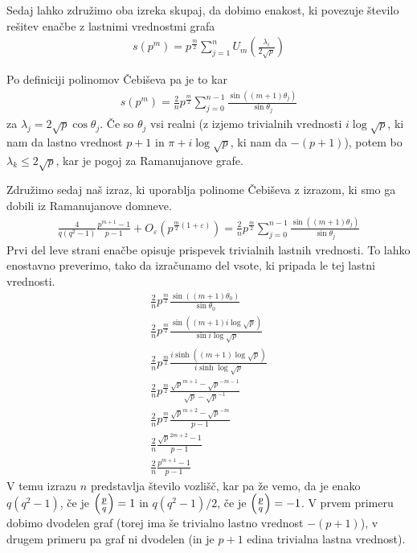 Sedaj lahko združimo oba izreka skupaj, da dobimo enakost, ki povezuje število rešitev enačbe z lastnimi vrednostmi grafa
\begin{align*}
    s(p^m) = p^{\frac{m}{2}}\sum_{j=1}^n U_m \left(\frac{\lambda_i}{2\sqrt{p}}\right)
\end{align*}

Po definiciji polinomov Čebiševa pa je to kar
\begin{align*}
    s(p^m) = \frac{2}{n} p^\frac{m}{2}\sum_{j=0}^{n-1}\frac{\sin((m+1)\theta_j)}{\sin \theta_j}
\end{align*}
za \(\lambda_j = 2\sqrt{p}\cos\theta_j\). Če so \(\theta_j\) vsi realni (z izjemo trivialnih vrednosti \(i\log\sqrt p\), ki nam da lastno vrednost \(p+1\) in \(\pi + i \log\sqrt{p}\), ki nam da \(-(p+1)\)), potem bo \(\lambda_k \leq 2\sqrt{p}\), kar je pogoj za Ramanujanove grafe. %

Združimo sedaj naš izraz, ki uporablja polinome Čebiševa z izrazom, ki smo ga dobili iz Ramanujanove domneve.
\begin{align}\label{ramanujanova-domneva-izraz}
    \frac{4}{q(q^2-1)}\frac{p^{m+1}-1}{p-1} + O_\varepsilon \left(p^{\frac{m}{2}(1+\varepsilon)}\right) = \frac{2}{n} p^\frac{m}{2}\sum_{j=0}^{n-1}\frac{\sin((m+1)\theta_j)}{\sin \theta_j}
\end{align}
Prvi del leve strani enačbe opisuje prispevek trivialnih lastnih vrednosti. To lahko enostavno preverimo, tako da izračunamo del vsote, ki pripada le tej lastni vrednosti.
\begin{align*}
    \frac{2}{n} p^\frac{m}{2}\frac{\sin((m+1)\theta_0)}{\sin \theta_0} \\
    \frac{2}{n}p^\frac{m}{2}\frac{\sin((m+1)i\log\sqrt p)}{\sin i\log\sqrt p} \\
    \frac{2}{n}p^\frac{m}{2}\frac{i\sinh((m+1)\log\sqrt p)}{i\sinh \log\sqrt p} \\
    \frac{2}{n}p^\frac{m}{2}\frac{ \sqrt{p}^{m+1} - \sqrt{p}^{-m-1}}{\sqrt{p} - \sqrt{p}^{-1}} \\
    \frac{2}{n}p^\frac{m}{2}\frac{ \sqrt{p}^{m+2} - \sqrt{p}^{-m}}{p - 1} \\
    \frac{2}{n}\frac{ \sqrt{p}^{2m+2} - 1}{p - 1} \\ 
    \frac{2}{n}\frac{ p^{m+1} - 1}{p - 1} 
\end{align*}
V temu izrazu \(n\) predstavlja število vozlišč, kar pa že vemo, da je enako \(q(q^2-1)\), če je \(\left(\frac{p}{q}\right)=1\) in \(q(q^2-1)/2\), če je \(\left(\frac{p}{q}\right)=-1\). V prvem primeru dobimo dvodelen graf (torej ima še trivialno lastno vrednost \(-(p+1)\)), v drugem primeru pa graf ni dvodelen (in je \(p+1\) edina trivialna lastna vrednost).

